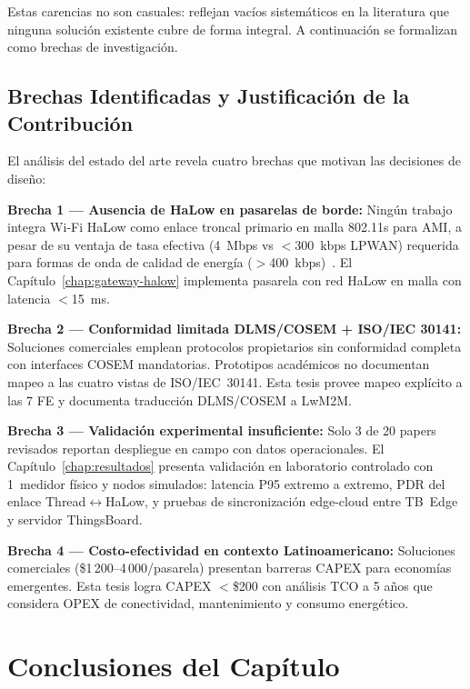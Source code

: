 Estas carencias no son casuales: reflejan vacíos sistemáticos en la literatura que ninguna solución existente cubre de forma integral. A continuación se formalizan como brechas de investigación.

\subsection{Brechas Identificadas y Justificación de la Contribución}
\label{sec:marco-estado-brecha}

El análisis del estado del arte revela cuatro brechas que motivan las decisiones de diseño:

\textbf{Brecha 1 --- Ausencia de HaLow en pasarelas de borde:} Ningún trabajo integra Wi-Fi HaLow como enlace troncal primario en malla 802.11s para AMI, a pesar de su ventaja de tasa efectiva (4~Mbps vs $<$300~kbps LPWAN) requerida para formas de onda de calidad de energía ($>$400~kbps)~\cite{chaudhariLPWANTechnologiesEmerging2020}. El Capítulo~\ref{chap:gateway-halow} implementa pasarela con red HaLow en malla con latencia $<$15~ms.

\textbf{Brecha 2 --- Conformidad limitada DLMS/COSEM + ISO/IEC 30141:} Soluciones comerciales emplean protocolos propietarios sin conformidad completa con interfaces COSEM mandatorias. Prototipos académicos no documentan mapeo a las cuatro vistas de ISO/IEC~30141. Esta tesis provee mapeo explícito a las 7 FE y documenta traducción DLMS/COSEM a LwM2M.

\textbf{Brecha 3 --- Validación experimental insuficiente:} Solo 3 de 20 papers revisados reportan despliegue en campo con datos operacionales. El Capítulo~\ref{chap:resultados} presenta validación en laboratorio controlado con 1~medidor físico y nodos simulados: latencia P95 extremo a extremo, PDR del enlace Thread$\leftrightarrow$HaLow, y pruebas de sincronización edge-cloud entre TB~Edge y servidor ThingsBoard.

\textbf{Brecha 4 --- Costo-efectividad en contexto Latinoamericano:} Soluciones comerciales (\$1\,200--4\,000/pasarela) presentan barreras CAPEX para economías emergentes. Esta tesis logra CAPEX $<$\$200 con análisis TCO a 5 años que considera OPEX de conectividad, mantenimiento y consumo energético.


\section{Conclusiones del Capítulo}
\label{sec:marco-conclusiones}

